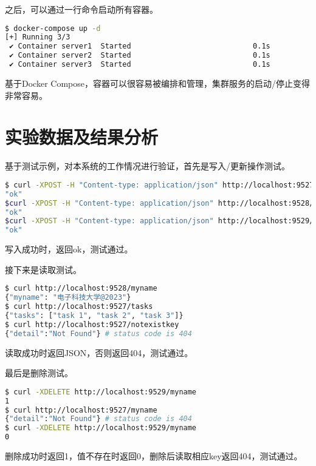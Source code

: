 之后，可以通过一行命令启动所有容器。

\begin{lstlisting}[language=Bash]
$ docker-compose up -d
[+] Running 3/3
 ✔ Container server1  Started                            0.1s
 ✔ Container server2  Started                            0.1s
 ✔ Container server3  Started                            0.1s 
\end{lstlisting}

基于Docker Compose，容器可以很容易被编排和管理，集群服务的启动/停止变得非常容易。

\section{实验数据及结果分析}

基于测试示例，对本系统的工作情况进行验证，首先是写入/更新操作测试。

\begin{lstlisting}[language=Bash]
$ curl -XPOST -H "Content-type: application/json" http://localhost:9527/ -d '{"myname": "电子科技大学@2023"}'
"ok"
$curl -XPOST -H "Content-type: application/json" http://localhost:9528/ -d '{"tasks": ["task 1", "task 2", "task 3"]}'
"ok"
$curl -XPOST -H "Content-type: application/json" http://localhost:9529/ -d '{"age": 123}'
"ok"
\end{lstlisting}

写入成功时，返回ok，测试通过。

接下来是读取测试。

\begin{lstlisting}[language=Bash]
$ curl http://localhost:9528/myname
{"myname": "电子科技大学@2023"}
$ curl http://localhost:9527/tasks
{"tasks": ["task 1", "task 2", "task 3"]}
$ curl http://localhost:9527/notexistkey
{"detail":"Not Found"} # status code is 404
\end{lstlisting}

读取成功时返回JSON，否则返回404，测试通过。

最后是删除测试。

\newpage

\begin{lstlisting}[language=Bash]
$ curl -XDELETE http://localhost:9529/myname
1
$ curl http://localhost:9527/myname
{"detail":"Not Found"} # status code is 404
$ curl -XDELETE http://localhost:9529/myname
0
\end{lstlisting}

删除成功时返回1，值不存在时返回0，删除后读取相应key返回404，测试通过。


